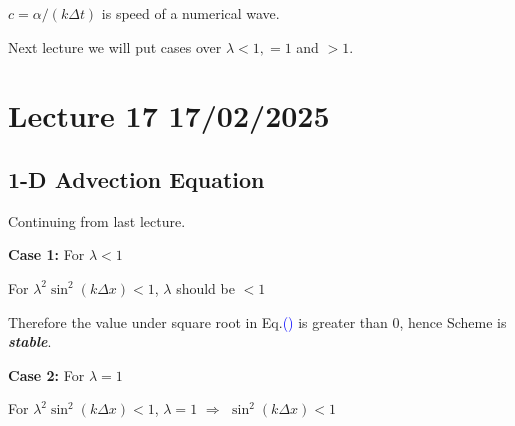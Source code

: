 \documentclass[fleqn,10pt]{SelfArx} %
\newcommand{\myeqref}[1]{Eq.\textcolor{blue}{\textup{(\getrefnumber{#1})}}}
\begin{document}
\(c = \alpha/(k\Delta t)\) is speed of a numerical wave.

Next lecture we will put cases over \( \lambda < 1, =1 \) and \( >1 \).

\clearpage

\section{Lecture 17 17/02/2025}
\subsection{1-D Advection Equation}
Continuing from last lecture.

\textbf{Case 1:} For \( \lambda < 1 \)

For \( \lambda^2 \sin^2(k\Delta x) < 1 \), \( \lambda \) should be \( < 1 \)

Therefore the value under square root in \myeqref{eq:15.8} is greater than 0, hence Scheme is \textbf{\textit{stable}}.
\begin{table}[h]
    \centering
    \renewcommand{\arraystretch}{1.5}
    \caption{Comparison of different modes and solutions for \( \lambda < 1 \)}
    \label{tab:modesforlamdalessthan1}
\end{table}


\textbf{Case 2:} For \( \lambda = 1 \)

For \( \lambda^2 \sin^2(k\Delta x) < 1\), \( \lambda = 1 \) $\Rightarrow$ \( \sin^2(k\Delta x) < 1 \)
\end{document}
